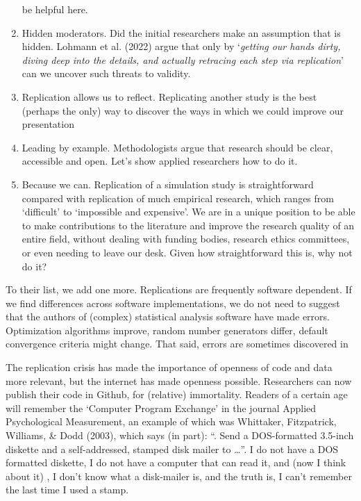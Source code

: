 \documentclass[
  letterpaper,
  DIV=11,
  numbers=noendperiod]{scrartcl}
\begin{document}
\begin{enumerate}
  be helpful here.
\item
  Hidden moderators. Did the initial researchers make an assumption that
  is hidden. Lohmann et al. (2022) argue that only by `\emph{getting our
  hands dirty, diving deep into the details, and actually retracing each
  step via replication}' can we uncover such threats to validity.
\item
  Replication allows us to reflect. Replicating another study is the
  best (perhaps the only) way to discover the ways in which we could
  improve our presentation
\item
  Leading by example. Methodologists argue that research should be
  clear, accessible and open. Let's show applied researchers how to do
  it.
\item
  Because we can. Replication of a simulation study is straightforward
  compared with replication of much empirical research, which ranges
  from `difficult' to `impossible and expensive'. We are in a unique
  position to be able to make contributions to the literature and
  improve the research quality of an entire field, without dealing with
  funding bodies, research ethics committees, or even needing to leave
  our desk. Given how straightforward this is, why not do it?
\end{enumerate}

To their list, we add one more. Replications are frequently software
dependent. If we find differences across software implementations, we do
not need to suggest that the authors of (complex) statistical analysis
software have made errors. Optimization algorithms improve, random
number generators differ, default convergence criteria might change.
That said, errors are sometimes discovered in

The replication crisis has made the importance of openness of code and
data more relevant, but the internet has made openness possible.
Researchers can now publish their code in Github, for (relative)
immortality. Readers of a certain age will remember the `Computer
Program Exchange' in the journal Applied Psychological Measurement, an
example of which was Whittaker, Fitzpatrick, Williams, \& Dodd (2003),
which says (in part): ``. Send a DOS-formatted 3.5-inch diskette and a
self-addressed, stamped disk mailer to \ldots{}''. I do not have a DOS
formatted diskette, I do not have a computer that can read it, and (now
I think about it) , I don't know what a disk-mailer is, and the truth
is, I can't remember the last time I used a stamp.
\end{document}
